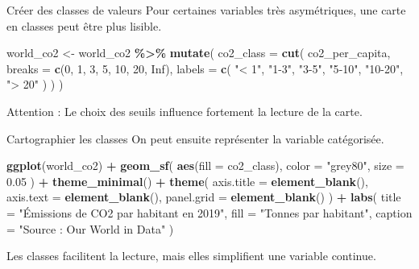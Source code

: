 \documentclass[
  10pt,
  ignorenonframetext,
]{beamer}
\newenvironment{Shaded}{\begin{snugshade}}{\end{snugshade}}
\newcommand{\AttributeTok}[1]{\textcolor[rgb]{0.13,0.29,0.53}{#1}}
\newcommand{\ConstantTok}[1]{\textcolor[rgb]{0.56,0.35,0.01}{#1}}
\newcommand{\DecValTok}[1]{\textcolor[rgb]{0.00,0.00,0.81}{#1}}
\newcommand{\FloatTok}[1]{\textcolor[rgb]{0.00,0.00,0.81}{#1}}
\newcommand{\FunctionTok}[1]{\textcolor[rgb]{0.13,0.29,0.53}{\textbf{#1}}}
\newcommand{\NormalTok}[1]{#1}
\newcommand{\OtherTok}[1]{\textcolor[rgb]{0.56,0.35,0.01}{#1}}
\newcommand{\SpecialCharTok}[1]{\textcolor[rgb]{0.81,0.36,0.00}{\textbf{#1}}}
\newcommand{\StringTok}[1]{\textcolor[rgb]{0.31,0.60,0.02}{#1}}
\begin{document}
\begin{frame}[fragile]{Créer des classes de valeurs}
\label{cruxe9er-des-classes-de-valeurs}
Pour certaines variables très asymétriques, une carte en classes peut
être plus lisible.

\begin{Shaded}
\begin{Highlighting}[]
\NormalTok{world\_co2 }\OtherTok{\textless{}{-}}\NormalTok{ world\_co2 }\SpecialCharTok{\%\textgreater{}\%}
  \FunctionTok{mutate}\NormalTok{(}
    \AttributeTok{co2\_class =} \FunctionTok{cut}\NormalTok{(}
\NormalTok{      co2\_per\_capita,}
      \AttributeTok{breaks =} \FunctionTok{c}\NormalTok{(}\DecValTok{0}\NormalTok{, }\DecValTok{1}\NormalTok{, }\DecValTok{3}\NormalTok{, }\DecValTok{5}\NormalTok{, }\DecValTok{10}\NormalTok{, }\DecValTok{20}\NormalTok{, }\ConstantTok{Inf}\NormalTok{),}
      \AttributeTok{labels =} \FunctionTok{c}\NormalTok{(}
        \StringTok{"\textless{} 1"}\NormalTok{,}
        \StringTok{"1{-}3"}\NormalTok{,}
        \StringTok{"3{-}5"}\NormalTok{,}
        \StringTok{"5{-}10"}\NormalTok{,}
        \StringTok{"10{-}20"}\NormalTok{,}
        \StringTok{"\textgreater{} 20"}
\NormalTok{      )}
\NormalTok{    )}
\NormalTok{  )}
\end{Highlighting}
\end{Shaded}

Attention : Le choix des seuils influence fortement la lecture de la
carte.
\end{frame}

\begin{frame}[fragile]{Cartographier les classes}
\label{cartographier-les-classes}
On peut ensuite représenter la variable catégorisée.

\begin{Shaded}
\begin{Highlighting}[]
\FunctionTok{ggplot}\NormalTok{(world\_co2) }\SpecialCharTok{+}
  \FunctionTok{geom\_sf}\NormalTok{(}
    \FunctionTok{aes}\NormalTok{(}\AttributeTok{fill =}\NormalTok{ co2\_class),}
    \AttributeTok{color =} \StringTok{"grey80"}\NormalTok{,}
    \AttributeTok{size =} \FloatTok{0.05}
\NormalTok{  ) }\SpecialCharTok{+}
  \FunctionTok{theme\_minimal}\NormalTok{() }\SpecialCharTok{+}
  \FunctionTok{theme}\NormalTok{(}
    \AttributeTok{axis.title =} \FunctionTok{element\_blank}\NormalTok{(),}
    \AttributeTok{axis.text =} \FunctionTok{element\_blank}\NormalTok{(),}
    \AttributeTok{panel.grid =} \FunctionTok{element\_blank}\NormalTok{()}
\NormalTok{  ) }\SpecialCharTok{+}
  \FunctionTok{labs}\NormalTok{(}
    \AttributeTok{title =} \StringTok{"Émissions de CO2 par habitant en 2019"}\NormalTok{,}
    \AttributeTok{fill =} \StringTok{"Tonnes par habitant"}\NormalTok{,}
    \AttributeTok{caption =} \StringTok{"Source : Our World in Data"}
\NormalTok{  )}
\end{Highlighting}
\end{Shaded}

Les classes facilitent la lecture, mais elles simplifient une variable
continue.
\end{frame}
\end{document}
